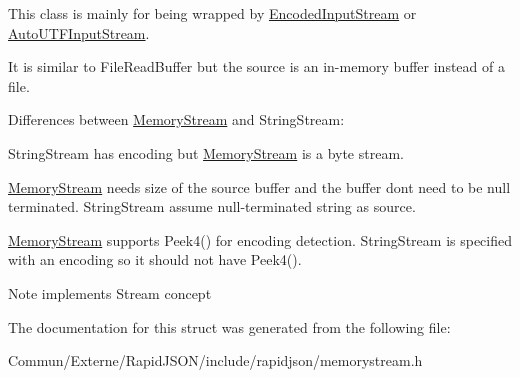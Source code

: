 This class is mainly for being wrapped by \hyperlink{class_encoded_input_stream}{Encoded\+Input\+Stream} or \hyperlink{class_auto_u_t_f_input_stream}{Auto\+U\+T\+F\+Input\+Stream}.

It is similar to File\+Read\+Buffer but the source is an in-\/memory buffer instead of a file.

Differences between \hyperlink{struct_memory_stream}{Memory\+Stream} and String\+Stream\+:
\begin{DoxyEnumerate}
\item String\+Stream has encoding but \hyperlink{struct_memory_stream}{Memory\+Stream} is a byte stream.
\item \hyperlink{struct_memory_stream}{Memory\+Stream} needs size of the source buffer and the buffer don\textquotesingle{}t need to be null terminated. String\+Stream assume null-\/terminated string as source.
\item \hyperlink{struct_memory_stream}{Memory\+Stream} supports Peek4() for encoding detection. String\+Stream is specified with an encoding so it should not have Peek4(). \begin{DoxyNote}{Note}
implements Stream concept 
\end{DoxyNote}

\end{DoxyEnumerate}

The documentation for this struct was generated from the following file\+:\begin{DoxyCompactItemize}
\item 
Commun/\+Externe/\+Rapid\+J\+S\+O\+N/include/rapidjson/memorystream.\+h\end{DoxyCompactItemize}
